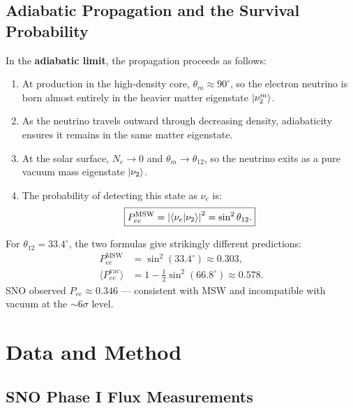 \documentclass[12pt, a4paper]{article}
\begin{document}
\subsection{Adiabatic Propagation and the Survival Probability}
 
In the \textbf{adiabatic limit}, the propagation proceeds as follows:
\begin{enumerate}
    \item At production in the high-density core, $\theta_m \approx 90^\circ$,
          so the electron neutrino is born almost entirely in the heavier
          matter eigenstate $\ket{\nu_2^m}$.
    \item As the neutrino travels outward through decreasing density,
          adiabaticity ensures it remains in the same matter eigenstate.
    \item At the solar surface, $N_e \to 0$ and $\theta_m \to \theta_{12}$,
          so the neutrino exits as a pure vacuum mass eigenstate $\ket{\nu_2}$.
    \item The probability of detecting this state as $\nu_e$ is:
          \begin{equation}
              \boxed{P_{ee}^{\text{MSW}}
              = \left|\braket{\nu_e}{\nu_2}\right|^2
              = \sin^2\theta_{12}.}
              \label{eq:pmsw}
          \end{equation}
\end{enumerate}
For $\theta_{12} = 33.4^\circ$, the two formulas give strikingly
different predictions:
\begin{align}
    P_{ee}^{\text{MSW}}
        &= \sin^2(33.4^\circ) \approx 0.303, \label{eq:pmsw_num}\\
    \langle P_{ee}^{\text{vac}}\rangle
        &= 1 - \tfrac{1}{2}\sin^2(66.8^\circ) \approx 0.578.
        \label{eq:pvac_num}
\end{align}
SNO observed $P_{ee} \approx 0.346$ --- consistent with MSW and
incompatible with vacuum at the $\sim\!6\sigma$ level.
 
\section{Data and Method}
\label{sec:data}
 
\subsection{SNO Phase I Flux Measurements}
 
\end{document}
